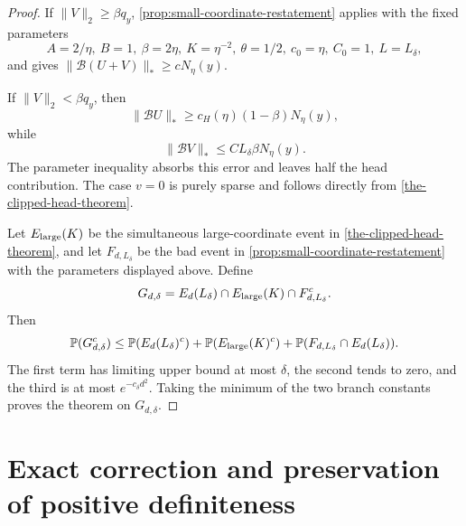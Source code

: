\documentclass[11pt]{article}
\numberwithin{equation}{section}
\theoremstyle{definition}
\theoremstyle{remark}
\newcommand{\Pp}{\mathbb P}
\newcommand{\1}{\boldsymbol 1}
\begin{document}
\begin{aiblock}
\begin{proof}
  If $\|V\|_2\ge\beta q_y$,
  \cref{prop:small-coordinate-restatement} applies with
  the fixed parameters
  \[
    A=2/\eta,\ B=1,\ \beta=2\eta,\ K=\eta^{-2},\
    \theta=1/2,\ c_0=\eta,\ C_0=1,\ L=L_\delta,
  \]
  and gives $\|\mathcal{B}(U+V)\|_*\ge cN_\eta(y)$.

  If $\|V\|_2<\beta q_y$, then
  \[
    \|\mathcal{B}U\|_* \ge c_H(\eta)(1-\beta)N_\eta(y),
  \]
  while
  \[
    \|\mathcal{B}V\|_* \le CL_\delta\beta N_\eta(y).
  \]
  The parameter inequality absorbs this error and leaves
  half the head contribution. The case $v=0$ is purely
  sparse and follows directly from
  \cref{the-clipped-head-theorem}.

  Let $E_{\rm large}(K)$ be the simultaneous
  large-coordinate event in
  \cref{the-clipped-head-theorem}, and let
  $F_{d,L_\delta}$ be the bad event in
  \cref{prop:small-coordinate-restatement} with the
  parameters displayed above. Define
  \[
    G_{d,\delta}=E_d(L_\delta)\cap E_{\rm large}(K)\cap
    F_{d,L_\delta}^c.
  \]
  Then
  \[
    \Pp(G_{d,\delta}^c)\le\Pp(E_d(L_\delta)^c)+
    \Pp(E_{\rm large}(K)^c)+\Pp(F_{d,L_\delta}\cap
    E_d(L_\delta)).
  \]
  The first term has limiting upper bound at most
  $\delta$, the second tends to zero, and the third is
  at most $e^{-c_\delta d^2}$. Taking the minimum of the
  two branch constants proves the theorem on
  $G_{d,\delta}$.
\end{proof}

\end{aiblock}

\section{Exact correction and preservation of positive
  definiteness}\label{quotient-exactification-and-sat-below-one-quarter}
\end{document}
